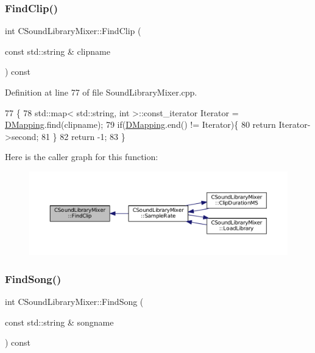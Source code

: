 \subsubsection{\texorpdfstring{Find\+Clip()}{FindClip()}}
{\footnotesize\ttfamily int C\+Sound\+Library\+Mixer\+::\+Find\+Clip (\begin{DoxyParamCaption}\item[{const std\+::string \&}]{clipname }\end{DoxyParamCaption}) const}



Definition at line 77 of file Sound\+Library\+Mixer.\+cpp.


\begin{DoxyCode}
77                                                                \{
78     std::map< std::string, int >::const\_iterator Iterator = \hyperlink{classCSoundLibraryMixer_a8f193156cafc61b64f04ed88dcabd27d}{DMapping}.find(clipname);
79     \textcolor{keywordflow}{if}(\hyperlink{classCSoundLibraryMixer_a8f193156cafc61b64f04ed88dcabd27d}{DMapping}.end() != Iterator)\{
80         \textcolor{keywordflow}{return} Iterator->second;
81     \}
82     \textcolor{keywordflow}{return} -1;
83 \}
\end{DoxyCode}
Here is the caller graph for this function\+:\nopagebreak
\begin{figure}[H]
\begin{center}
\leavevmode
\includegraphics[width=350pt]{classCSoundLibraryMixer_ad8cc956bda999fe677e92f7392834b7a_icgraph}
\end{center}
\end{figure}
\hypertarget{classCSoundLibraryMixer_a67d0364979fab26c2b2467357ec03696}{}\label{classCSoundLibraryMixer_a67d0364979fab26c2b2467357ec03696} 
\subsubsection{\texorpdfstring{Find\+Song()}{FindSong()}}
{\footnotesize\ttfamily int C\+Sound\+Library\+Mixer\+::\+Find\+Song (\begin{DoxyParamCaption}\item[{const std\+::string \&}]{songname }\end{DoxyParamCaption}) const}



